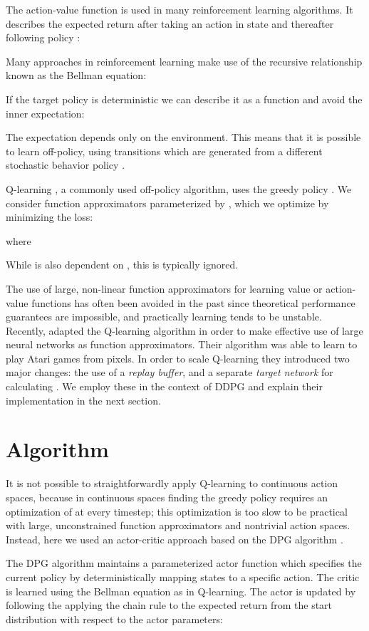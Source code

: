 \documentclass{article} \usepackage{iclr2016_conference,times}
\begin{document}
The action-value function is used in many reinforcement learning algorithms. It
describes the expected return after taking an action  in state  and
thereafter following policy :


Many approaches in reinforcement learning make use of the recursive
relationship known as the Bellman equation:


If the target policy is deterministic we can describe it as a function
 and avoid the inner expectation:


The expectation depends only on the environment.
This means that it is possible to learn  off-policy, using
transitions which are generated from a different stochastic
behavior policy .

Q-learning \citep{watkins1992q}, a commonly used off-policy algorithm,
uses the greedy policy . We consider
function approximators parameterized by , which we optimize
by minimizing the loss:

where

While  is also dependent on , this is typically ignored.

The use of large, non-linear function approximators for learning value
or action-value functions has often been avoided in the past since
theoretical performance guarantees are impossible, and practically
learning tends to be unstable.  Recently,
\citep{mnih2013playing,mnih2015human} adapted the Q-learning algorithm
in order to make effective use of large neural networks as function
approximators.  Their algorithm was able to learn to play Atari games
from pixels.  In order to scale Q-learning they introduced two major
changes: the use of a \textit{replay buffer}, and a separate
\textit{target network} for calculating . We employ these in the
context of DDPG and explain their implementation in the next section.

\section{Algorithm}

It is not possible to straightforwardly apply Q-learning to continuous
action spaces, because in continuous spaces finding the greedy policy requires an
optimization of  at every
timestep; this optimization is too slow to be practical with large, unconstrained
function approximators and nontrivial action spaces.
Instead, here we used an actor-critic approach based
on the DPG algorithm \citep{silver2014deterministic}.

The DPG algorithm
maintains a parameterized actor function 
which specifies the current policy by deterministically mapping states to a
specific action. The critic  is learned using the
Bellman equation as in Q-learning. The actor is updated by following the
applying the chain rule to the expected return from the start distribution
 with respect to the actor parameters:
\end{document}

